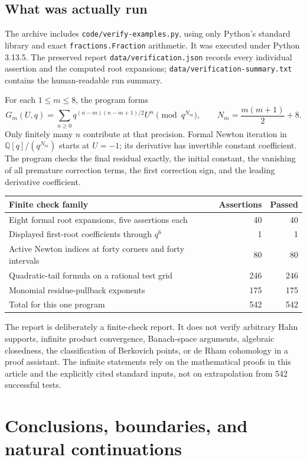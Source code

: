 \documentclass[11pt,a4paper]{article}
\numberwithin{equation}{section}
\theoremstyle{definition}
\theoremstyle{remark}
\newcommand{\Q}{\mathbb Q}
\begin{document}
\subsection{What was actually run}
The archive includes \texttt{code/verify-examples.py}, using only Python's standard
library and exact \texttt{fractions.Fraction} arithmetic. It was executed under
Python 3.13.5. The preserved report \texttt{data/verification.json} records every individual
assertion and the computed root expansions; \texttt{data/verification-summary.txt}
contains the human-readable run summary.

For each $1\le m\le8$, the program forms
\[
 G_m(U,q)=\sum_{n\ge0}q^{(n-m)(n-m+1)/2}U^n
 \pmod{q^{N_m}},\qquad N_m=\frac{m(m+1)}2+8.
\]
Only finitely many $n$ contribute at that precision. Formal Newton iteration in
$\Q[q]/(q^{N_m})$ starts at $U=-1$; its derivative has invertible constant
coefficient. The program checks the final residual exactly, the initial
constant, the vanishing of all premature correction terms, the first correction
sign, and the leading derivative coefficient.

\begin{center}\small
\begin{tabularx}{\textwidth}{@{}Lrr@{}}
\toprule
Finite check family & Assertions & Passed\\\midrule
Eight formal root expansions, five assertions each & 40 & 40\\
Displayed first-root coefficients through $q^6$ & 1 & 1\\
Active Newton indices at forty corners and forty intervals & 80 & 80\\
Quadratic-tail formula on a rational test grid & 246 & 246\\
Monomial residue-pullback exponents & 175 & 175\\\midrule
Total for this one program & 542 & 542\\\bottomrule
\end{tabularx}
\end{center}

The report is deliberately a finite-check report. It does not verify arbitrary
Hahn supports, infinite product convergence, Banach-space arguments, algebraic
closedness, the classification of Berkovich points, or de Rham cohomology in a
proof assistant. The infinite statements rely on the mathematical proofs in this
article and the explicitly cited standard inputs, not on extrapolation from
542 successful tests.

\section{Conclusions, boundaries, and natural continuations}
\label{sec:conclusion}
\end{document}
